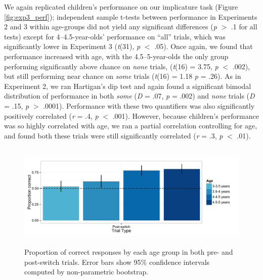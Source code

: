 \documentclass[man]{apa2}
\begin{document}
We again replicated children's performance on our implicature task (Figure \ref{fig:exp3_perf}); independent sample t-tests between performance in Experiments 2 and 3 within age-groups did not yield any significant differences (\emph{p} $>$ .1 for all tests) except for 4--4.5-year-olds' performance on ``all'' trials, which was significantly lower in Experiment 3 (\emph{t}(31), \emph{p} $<$ .05). Once again, we found that performance increased with age, with the 4.5--5-year-olds the only group performing significantly above chance on \emph{none} trials, (\emph{t}(16) = 3.75, \emph{p} $<$ .002), but still performing near chance on \textit{some} trials (\emph{t}(16) = 1.18 \emph{p} = .26). As in Experiment 2, we ran Hartigan's dip test and again found a significant bimodal distribution of performance in both \textit{some} (\textit{D} = .07, \textit{p} = .002) and \textit{none} trials (\textit{D} = .15, \textit{p} $>$ .0001). Performance with these two quantifiers was also significantly positively correlated (\emph{r} = .4, \emph{p} $<$ .001). However, because children's performance was so highly correlated with age, we ran a partial correlation controlling for age, and found both these trials were still significantly correlated (\emph{r} = .3, \emph{p} $<$ .01). 


\begin{figure} 
 \begin{center} 
  \includegraphics[height=2in]{figures/DCCS.pdf} 
  \caption{\label{fig:exp3_DCCS} Proportion of correct responses by each age group in both pre- and post-switch trials.  Error bars show 95\% confidence intervals computed by non-parametric bootstrap.} 
 \end{center} 
\end{figure}
\end{document}
